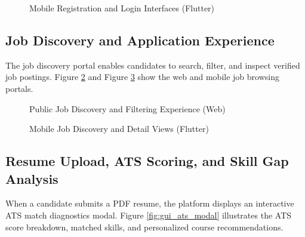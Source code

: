 \begin{figure}[h!]
\centering
{}
\caption{Mobile Registration and Login Interfaces (Flutter)}
\label{fig:gui_auth_mobile}
\end{figure}

\subsection{Job Discovery and Application Experience}
The job discovery portal enables candidates to search, filter, and inspect verified job postings. Figure \ref{fig:gui_browse_web} and Figure \ref{fig:gui_browse_mobile} show the web and mobile job browsing portals.

\begin{figure}[h!]
\centering
{}
\caption{Public Job Discovery and Filtering Experience (Web)}
\label{fig:gui_browse_web}
\end{figure}

\begin{figure}[h!]
\centering
{}
\caption{Mobile Job Discovery and Detail Views (Flutter)}
\label{fig:gui_browse_mobile}
\end{figure}

\subsection{Resume Upload, ATS Scoring, and Skill Gap Analysis}
When a candidate submits a PDF resume, the platform displays an interactive ATS match diagnostics modal. Figure \ref{fig:gui_ats_modal} illustrates the ATS score breakdown, matched skills, and personalized course recommendations.

